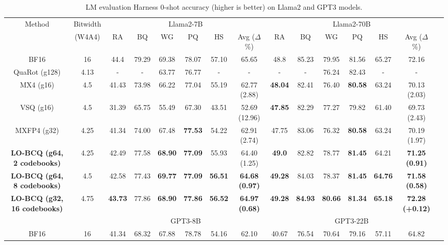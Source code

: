 \begin{table*} [!t]\scriptsize
\setlength{\tabcolsep}{4.75pt}
\begin{center}
\caption{\label{tab:lm_harness_acc} \small LM evaluation Harness 0-shot accuracy (higher is better) on Llama2 and GPT3 models.}
\begin{tabular}{|c|c||c|c|c|c|c|c||c|c|c|c|c|c|c|} 
\hline
 Method &  Bitwidth  & \multicolumn{6}{c||}{\cellcolor[gray]{0.95} Llama2-7B} &  \multicolumn{6}{c|}{\cellcolor[gray]{0.95} Llama2-70B} \\
 & (W4A4) & RA & BQ & WG & PQ & HS & Avg ($\Delta$ \%) & RA & BQ & WG & PQ & HS & Avg ($\Delta$ \%) \\
\hline
BF16 & 16 & 44.4 & 79.29 & 69.38 & 78.07 & 57.10 & 65.65 & 48.8 & 85.23 & 79.95 & 81.56 & 65.27 & 72.16 \\
QuaRot (g128) & 4.13 & - & - & 63.77 & 76.77 & - & - & - & - & 76.24 & 82.43 & - & - \\
MX4 (g16)  & 4.5 & 41.43 & 73.98 & 66.22 & 77.04 & 55.19 & 62.77 (2.88) &\textbf{48.04} & 82.41 & 76.40 & \textbf{80.58} & 63.24 & 70.13 (2.03) \\
VSQ (g16)  & 4.5 & 31.39 & 65.75 & 55.49 & 67.30 & 43.51 & 52.69 (12.96) & \textbf{47.85} & 82.29 & 77.27  & 79.82 & 61.40 & 69.73 (2.43) \\
MXFP4 (g32) & 4.25 & 41.34 & 74.00 & 67.48 & \textbf{77.53} & 54.22 & 62.91 (2.74) & 47.75 & 83.06 & 76.32 & \textbf{80.58} & 63.24 & 70.19 (1.97) \\
\rowcolor[gray]{0.9}
\textbf{LO-BCQ (g64, 2 codebooks)}  & 4.25 & 42.49 & 77.58 & \textbf{68.90} & \textbf{77.09} & 55.93 & 64.40 (1.25) & \textbf{49.0}  & 82.82          & 78.77 & \textbf{81.45} & 64.21 & \textbf{71.25 (0.91)} \\
\rowcolor[gray]{0.9}
\textbf{LO-BCQ (g64, 8 codebooks) } & 4.5  &  42.58 & 77.43 & \textbf{69.77} & \textbf{77.09} & \textbf{56.51} & \textbf{64.68 (0.97)} & \textbf{49.28} & 84.03  & 78.37 & \textbf{81.45} & \textbf{64.76} & \textbf{71.58 (0.58)} \\
\rowcolor[gray]{0.9}
\textbf{LO-BCQ (g32, 16 codebooks)} & 4.75 &  \textbf{43.73} & 77.86 & \textbf{68.90} & \textbf{77.86} & \textbf{56.52} & \textbf{64.97 (0.68)} & \textbf{49.28} & \textbf{84.93} & \textbf{80.66} & \textbf{81.34} & \textbf{65.18} & \textbf{72.28 (+0.12)} \\
\hline
\rowcolor[gray]{0.95}
&  & \multicolumn{6}{c||}{GPT3-8B} &  \multicolumn{6}{c|}{GPT3-22B} \\
\hline
BF16 & 16   &  41.34  & 68.32  & 67.88 & 78.78  & 54.16 & 62.10 & 40.67 & 76.54 & 70.64 & 79.16 & 57.11 & 64.82 \\ 

\end{tabular}
\end{center}
\end{table*}

